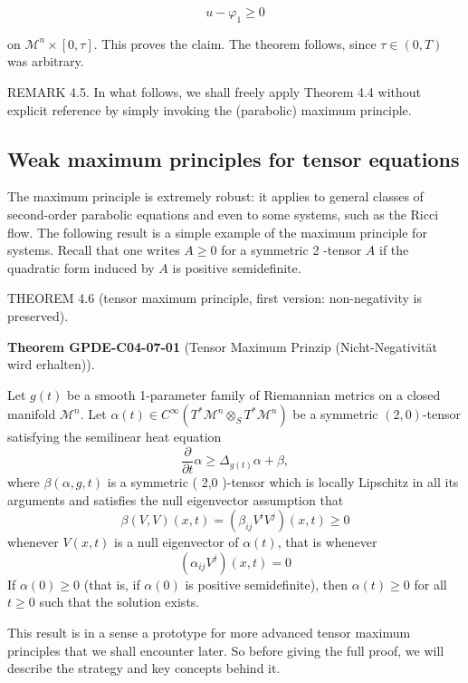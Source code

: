 \documentclass[10pt, letterpaper]{article}
\newcommand{\CustomHeading}[3]{%
  \par\medskip\noindent%
  \textbf{#1 #2} \textnormal{(#3)}.\enskip%
}
\newenvironment{THEO}[2]{\begin{unitbox}\CustomHeading{Theorem}{#1}{#2}}{\end{unitbox}}
\begin{document}
$$
u-\varphi_1 \geq 0
$$

on $\mathcal{M}^n \times[0, \tau]$. This proves the claim. The theorem follows, since $\tau \in(0, T)$ was arbitrary.



REMARK 4.5. In what follows, we shall freely apply Theorem 4.4 without explicit reference by simply invoking the (parabolic) maximum principle.



\pagebreak

\subsection{Weak maximum principles for tensor equations}


The maximum principle is extremely robust: it applies to general classes of second-order parabolic equations and even to some systems, such as the Ricci flow. The following result is a simple example of the maximum principle for systems. Recall that one writes $A \geq 0$ for a symmetric 2 -tensor $A$ if the quadratic form induced by $A$ is positive semidefinite.



THEOREM 4.6 (tensor maximum principle, first version: non-negativity is preserved). 

\begin{THEO}{GPDE-C04-07-01}{Tensor Maximum Prinzip (Nicht-Negativität wird erhalten)}
Let $g(t)$ be a smooth 1-parameter family of Riemannian metrics on a closed manifold $\mathcal{M}^n$. Let $\alpha(t) \in C^{\infty}\left(T^* \mathcal{M}^n \otimes_S T^* \mathcal{M}^n\right)$ be a symmetric $(2,0)$-tensor satisfying the semilinear heat equation
$$
\frac{\partial}{\partial t} \alpha \geq \Delta_{g(t)} \alpha+\beta,
$$
where $\beta(\alpha, g, t)$ is a symmetric ( 2,0 )-tensor which is locally Lipschitz in all its arguments and satisfies the null eigenvector assumption that
$$
\beta(V, V)(x, t)=\left(\beta_{i j} V^i V^j\right)(x, t) \geq 0
$$
whenever $V(x, t)$ is a null eigenvector of $\alpha(t)$, that is whenever
$$
\left(\alpha_{i j} V^j\right)(x, t)=0
$$
If $\alpha(0) \geq 0$ (that is, if $\alpha(0)$ is positive semidefinite), then $\alpha(t) \geq 0$ for all $t \geq 0$ such that the solution exists.
\end{THEO}



This result is in a sense a prototype for more advanced tensor maximum principles that we shall encounter later. So before giving the full proof, we will describe the strategy and key concepts behind it.
\end{document}
